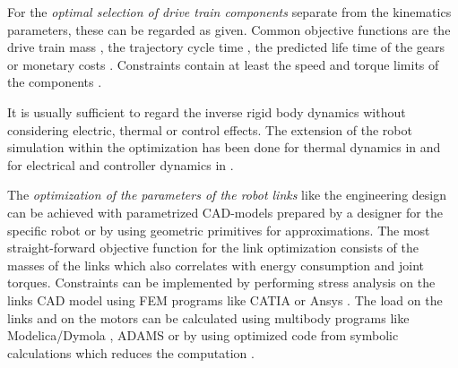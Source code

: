 \documentclass{svproc}
\begin{document}
For the \emph{optimal selection of drive train components} separate from the kinematics parameters, these can be regarded as given. %
Common objective functions are the drive train mass \cite{ChedmailGau1990,PetterssonOel2009,ZhouBaiHan2011}, the trajectory cycle time \cite{TarkianPerOelFen2011}, the predicted life time of the gears \cite{PetterssonAndKru2005} or monetary costs \cite{PetterssonAndKru2005}.
Constraints contain at least the speed and torque limits of the components \cite {ChedmailGau1990,PetterssonOel2009,ZhouBaiHan2011}.

It is usually sufficient to regard the inverse rigid body dynamics without considering electric, thermal or control effects.
The extension of the robot simulation within the optimization has been done for thermal dynamics in \cite{ChedmailGau1990} and for electrical and controller dynamics in \cite{Padilla-GarciaCruRod2015}.


The \emph{optimization of the parameters of the robot links} like the engineering design can be achieved with parametrized CAD-models prepared by a designer for the specific robot \cite{TarkianPerOelFen2011,ZhouBai2015} or by using geometric primitives \cite{RamirezKotOrt2017} for approximations. %
The most straight-forward objective function for the link optimization consists of the masses of the links which also correlates with energy consumption and joint torques.
Constraints can be implemented by performing stress analysis on the links CAD model using FEM programs like CATIA \cite{TarkianPerOelFen2011} or Ansys \cite{ZhouBai2015}.
The load on the links and on the motors can be calculated using multibody programs like Modelica/Dymola \cite{TarkianPerOelFen2011}, ADAMS \cite{ZhouBaiHan2011} or by using optimized code from symbolic calculations \cite{ChedmailGau1990} which reduces the computation \cite{KhalilDom2002}.
\end{document}
